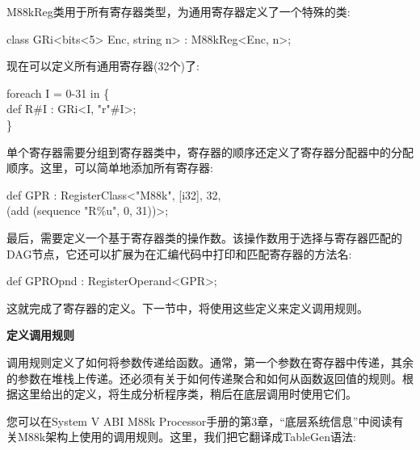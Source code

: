 M88kReg类用于所有寄存器类型，为通用寄存器定义了一个特殊的类:\par

\begin{tcolorbox}[colback=white,colframe=black]
class GRi<bits<5> Enc, string n> : M88kReg<Enc, n>;
\end{tcolorbox}

现在可以定义所有通用寄存器(32个)了:\par

\begin{tcolorbox}[colback=white,colframe=black]
foreach I = 0-31 in \{ \\
\hspace*{1cm}def R\#I : GRi<I, "r"\#I>; \\
\}
\end{tcolorbox}

单个寄存器需要分组到寄存器类中，寄存器的顺序还定义了寄存器分配器中的分配顺序。这里，可以简单地添加所有寄存器:\par

\begin{tcolorbox}[colback=white,colframe=black]
def GPR : RegisterClass<"M88k", [i32], 32, \\
\hspace*{4.5cm}(add (sequence "R\%u", 0, 31))>;
\end{tcolorbox}

最后，需要定义一个基于寄存器类的操作数。该操作数用于选择与寄存器匹配的DAG节点，它还可以扩展为在汇编代码中打印和匹配寄存器的方法名:\par

\begin{tcolorbox}[colback=white,colframe=black]
def GPROpnd : RegisterOperand<GPR>;
\end{tcolorbox}

这就完成了寄存器的定义。下一节中，将使用这些定义来定义调用规则。\par

\hspace*{\fill} \par %
\textbf{定义调用规则}

调用规则定义了如何将参数传递给函数。通常，第一个参数在寄存器中传递，其余的参数在堆栈上传递。还必须有关于如何传递聚合和如何从函数返回值的规则。根据这里给出的定义，将生成分析程序类，稍后在底层调用时使用它们。\par

您可以在System V ABI M88k Processor手册的第3章，“底层系统信息”中阅读有关M88k架构上使用的调用规则。这里，我们把它翻译成TableGen语法:\par

